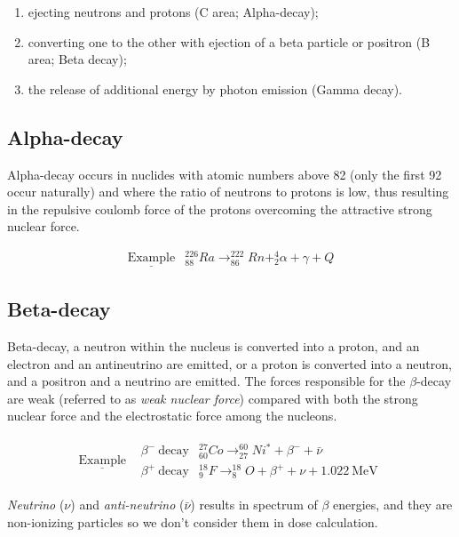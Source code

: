 \documentclass[]{book}
\providecommand{\tightlist}{%
  \setlength{\itemsep}{0pt}\setlength{\parskip}{0pt}}
\theoremstyle{definition}
\theoremstyle{definition}
\theoremstyle{definition}
\theoremstyle{remark}
\begin{document}
\begin{enumerate}
\def\labelenumi{\arabic{enumi}.}
\tightlist
\item
  ejecting neutrons and protons (C area; Alpha-decay);
\item
  converting one to the other with ejection of a beta particle or
  positron (B area; Beta decay);
\item
  the release of additional energy by photon emission (Gamma decay).
\end{enumerate}

\subsection{Alpha-decay}\label{alpha}

Alpha-decay occurs in nuclides with atomic numbers above 82 (only the
first 92 occur naturally) and where the ratio of neutrons to protons is
low, thus resulting in the repulsive coulomb force of the protons
overcoming the attractive strong nuclear force.

\[
\begin{matrix}
\underline{\text{Example}} & _{88}^{226}Ra\rightarrow _{86}^{222}Rn +_2^4\alpha +\gamma +Q
\end{matrix}
\]

\subsection{Beta-decay}\label{beta}

Beta-decay, a neutron within the nucleus is converted into a proton, and
an electron and an antineutrino are emitted, or a proton is converted
into a neutron, and a positron and a neutrino are emitted. The forces
responsible for the \(\beta\)-decay are weak (referred to as \emph{weak
nuclear force}) compared with both the strong nuclear force and the
electrostatic force among the nucleons.

\[
\begin{matrix}
\underline{\text{Example}} & \begin{matrix}
    \beta^-\  \text{decay}& _{60}^{27}Co\rightarrow _{27}^{60}Ni^{*} +\beta^- + \bar\nu \\ 
    \beta^+\  \text{decay} & _{9}^{18}F\rightarrow _{8}^{18}O +\beta^+ +\nu + 1.022\ \text{MeV}
  \end{matrix}
\end{matrix}
\]

\emph{Neutrino} (\(\nu\)) and \emph{anti-neutrino} (\(\bar \nu\))
results in spectrum of \(\beta\) energies, and they are non-ionizing
particles so we don't consider them in dose calculation.
\end{document}
